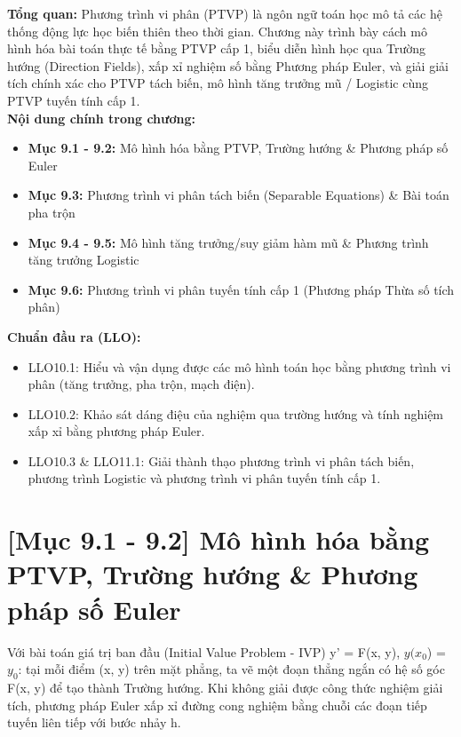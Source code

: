 \documentclass[11pt,a4paper,oneside]{book}
\begin{document}
\begin{tcolorbox}[colback=slate!5!white,colframe=slate!75!black,title={\textbf{Mục lục Chương 9 \& Chuẩn đầu ra (Buổi 10 - 11)}}]
\textbf{Tổng quan:} Phương trình vi phân (PTVP) là ngôn ngữ toán học mô tả các hệ thống động lực học biến thiên theo thời gian. Chương này trình bày cách mô hình hóa bài toán thực tế bằng PTVP cấp 1, biểu diễn hình học qua Trường hướng (Direction Fields), xấp xỉ nghiệm số bằng Phương pháp Euler, và giải giải tích chính xác cho PTVP tách biến, mô hình tăng trưởng mũ / Logistic cùng PTVP tuyến tính cấp 1.\\[6pt]
\textbf{Nội dung chính trong chương:}
\begin{itemize}[leftmargin=1.5em, itemsep=2pt]
  \item \textbf{Mục 9.1 - 9.2:} Mô hình hóa bằng PTVP, Trường hướng \& Phương pháp số Euler
  \item \textbf{Mục 9.3:} Phương trình vi phân tách biến (Separable Equations) \& Bài toán pha trộn
  \item \textbf{Mục 9.4 - 9.5:} Mô hình tăng trưởng/suy giảm hàm mũ \& Phương trình tăng trưởng Logistic
  \item \textbf{Mục 9.6:} Phương trình vi phân tuyến tính cấp 1 (Phương pháp Thừa số tích phân)
\end{itemize}
\textbf{Chuẩn đầu ra (LLO):}
\begin{itemize}[leftmargin=1.5em, itemsep=2pt]
  \item LLO10.1: Hiểu và vận dụng được các mô hình toán học bằng phương trình vi phân (tăng trưởng, pha trộn, mạch điện).
  \item LLO10.2: Khảo sát dáng điệu của nghiệm qua trường hướng và tính nghiệm xấp xỉ bằng phương pháp Euler.
  \item LLO10.3 \& LLO11.1: Giải thành thạo phương trình vi phân tách biến, phương trình Logistic và phương trình vi phân tuyến tính cấp 1.
\end{itemize}
\end{tcolorbox}

\section{[Mục 9.1 - 9.2] Mô hình hóa bằng PTVP, Trường hướng \& Phương pháp số Euler}
Với bài toán giá trị ban đầu (Initial Value Problem - IVP) y' = F(x, y), $y(x_0$) = $y_0$: tại mỗi điểm (x, y) trên mặt phẳng, ta vẽ một đoạn thẳng ngắn có hệ số góc F(x, y) để tạo thành Trường hướng. Khi không giải được công thức nghiệm giải tích, phương pháp Euler xấp xỉ đường cong nghiệm bằng chuỗi các đoạn tiếp tuyến liên tiếp với bước nhảy h.
\end{document}
